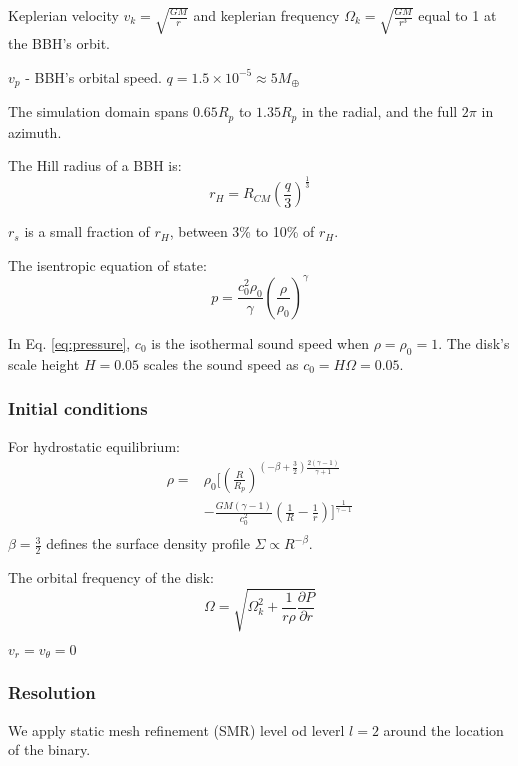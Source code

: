 \documentclass[twocolumn]{aastex631}
\begin{document}
Keplerian velocity $v_k=\sqrt{\frac{GM}{r}}$ and keplerian frequency $\Omega_k=\sqrt{\frac{GM}{r^3}}$ equal to 1 at the BBH's orbit.

$v_p$ - BBH's orbital speed. 
$q = 1.5\times 10^{-5} \approx 5 M_{\oplus}$

The simulation domain spans $0.65R_p$ to $1.35R_p$ in the radial, and the full $2\pi$ in azimuth.

The Hill radius of a BBH is:
\begin{equation}\label{eq:Hill}
    r_H=R_{CM}\left(\frac{q}{3}\right)^{\frac{1}{3}}
\end{equation}

$r_s$ is a small fraction of $r_H$, between 3\% to 10\% of $r_H$.

The isentropic equation of state:
\begin{equation}\label{eq:pressure}
    p = \frac{c_0^2\rho_0}{\gamma}\left(\frac{\rho}{\rho_0}\right)^\gamma
\end{equation}

In Eq. \ref{eq:pressure}, $c_0$ is the isothermal sound speed when $\rho=\rho_0=1$. 
The disk's scale height $H = 0.05$ scales the sound speed as $c_0 = H\Omega=0.05$.

\subsubsection{Initial conditions}
For hydrostatic equilibrium:
\begin{equation}\label{eq:density}
\begin{aligned}
     \rho = & \rho_0 \bigg[\left(\frac{R}{R_p}\right)^{(-\beta+\frac{3}{2})\frac{2(\gamma-1)}{\gamma+1}} \\ 
    & - \frac{GM(\gamma-1)}{c_0^2}\left(\frac{1}{R}-\frac{1}{r}\right)\bigg]^{\frac{1}{\gamma-1}} \\
\end{aligned}
\end{equation}
$\beta=\frac{3}{2}$ defines the surface density profile $\Sigma\propto R^{-\beta}$.

The orbital frequency of the disk:
\begin{equation}\label{eq:omegadisk}
    \Omega = \sqrt{\Omega_k^2+\frac{1}{r\rho}\frac{\partial P}{\partial r}}
\end{equation}

$v_r=v_\theta=0$


\subsubsection{Resolution}
We apply static mesh refinement (SMR) level od leverl $l=2$ around the location of the binary.
\end{document}
